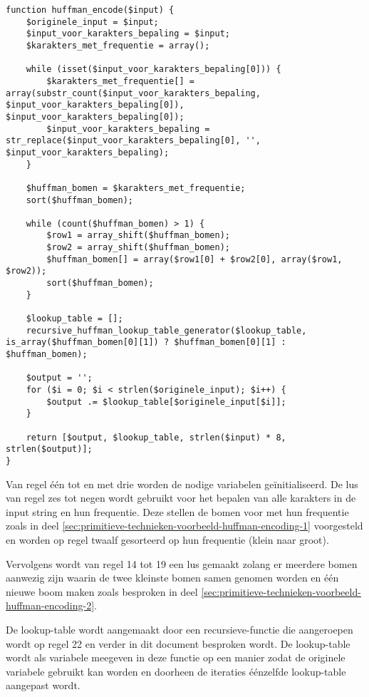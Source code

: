 \begin{lstlisting}
function huffman_encode($input) {
	$originele_input = $input;
	$input_voor_karakters_bepaling = $input;
	$karakters_met_frequentie = array();
	
	while (isset($input_voor_karakters_bepaling[0])) {
		$karakters_met_frequentie[] = array(substr_count($input_voor_karakters_bepaling, $input_voor_karakters_bepaling[0]), $input_voor_karakters_bepaling[0]);
		$input_voor_karakters_bepaling = str_replace($input_voor_karakters_bepaling[0], '', $input_voor_karakters_bepaling);
	}
	
	$huffman_bomen = $karakters_met_frequentie;
	sort($huffman_bomen);
	
	while (count($huffman_bomen) > 1) {
		$row1 = array_shift($huffman_bomen);
		$row2 = array_shift($huffman_bomen);
		$huffman_bomen[] = array($row1[0] + $row2[0], array($row1, $row2));
		sort($huffman_bomen);
	}
	
	$lookup_table = [];
	recursive_huffman_lookup_table_generator($lookup_table, is_array($huffman_bomen[0][1]) ? $huffman_bomen[0][1] : $huffman_bomen);
	
	$output = '';
	for ($i = 0; $i < strlen($originele_input); $i++) {
		$output .= $lookup_table[$originele_input[$i]];
	}
	
	return [$output, $lookup_table, strlen($input) * 8, strlen($output)];
}
\end{lstlisting}

Van regel één tot en met drie worden de nodige variabelen geïnitialiseerd. De lus van regel zes tot negen wordt gebruikt voor het bepalen van alle karakters in de input \gls{string} en hun frequentie. Deze stellen de bomen voor met hun frequentie zoals in deel \ref{sec:primitieve-technieken-voorbeeld-huffman-encoding-1} voorgesteld en worden op regel twaalf gesorteerd op hun frequentie (klein naar groot).

Vervolgens wordt van regel 14 tot 19 een lus gemaakt zolang er meerdere bomen aanwezig zijn waarin de twee kleinste bomen samen genomen worden en één nieuwe boom maken zoals besproken in deel \ref{sec:primitieve-technieken-voorbeeld-huffman-encoding-2}.

De \gls{lookup-table} wordt aangemaakt door een \gls{recursieve-functie} die aangeroepen wordt op regel 22 en verder in dit document besproken wordt. De \gls{lookup-table} wordt als variabele meegeven in deze functie op een manier zodat de originele variabele gebruikt kan worden en doorheen de iteraties éénzelfde \gls{lookup-table} aangepast wordt.

